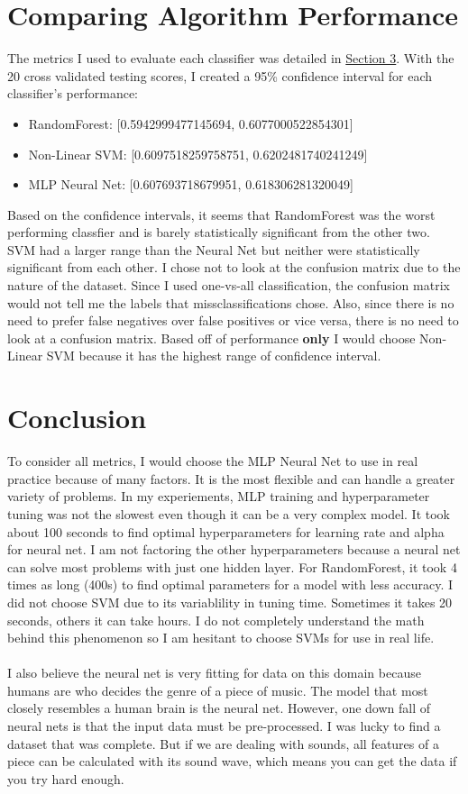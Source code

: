 \documentclass[12pt]{article}
\begin{document}
\section{Comparing Algorithm Performance}
The metrics I used to evaluate each classifier was detailed in \hyperref[tuning]{Section 3}. With the 20 cross validated testing scores, I created a 95\% confidence interval for each classifier's performance:
\begin{itemize}
    \item RandomForest: [0.5942999477145694, 0.6077000522854301]
    \item Non-Linear SVM: [0.6097518259758751, 0.6202481740241249]
    \item MLP Neural Net: [0.607693718679951, 0.618306281320049]
\end{itemize}
Based on the confidence intervals, it seems that RandomForest was the worst performing classfier and is barely statistically significant from the other two. SVM had a larger range than the Neural Net but neither were statistically significant from each other. I chose not to look at the confusion matrix due to the nature of the dataset. Since I used one-vs-all classification, the confusion matrix would not tell me the labels that missclassifications chose. Also, since there is no need to prefer false negatives over false positives or vice versa, there is no need to look at a confusion matrix. Based off of performance \textbf{only} I would choose Non-Linear SVM because it has the highest range of confidence interval.

\section{Conclusion}
To consider all metrics, I would choose the MLP Neural Net to use in real practice because of many factors. It is the most flexible and can handle a greater variety of problems. In my experiements, MLP training and hyperparameter tuning was not the slowest even though it can be a very complex model. It took about 100 seconds to find optimal hyperparameters for learning rate and alpha for neural net. I am not factoring the other hyperparameters because a neural net can solve most problems with just one hidden layer. For RandomForest, it took 4 times as long (400s) to find optimal parameters for a model with less accuracy. I did not choose SVM due to its variablility in tuning time. Sometimes it takes 20 seconds, others it can take hours. I do not completely understand the math behind this phenomenon so I am hesitant to choose SVMs for use in real life. \\ \\
I also believe the neural net is very fitting for data on this domain because humans are who decides the genre of a piece of music. The model that most closely resembles a human brain is the neural net. However, one down fall of neural nets is that the input data must be pre-processed. I was lucky to find a dataset that was complete. But if we are dealing with sounds, all features of a piece can be calculated with its sound wave, which means you can get the data if you try hard enough. 
\end{document}
